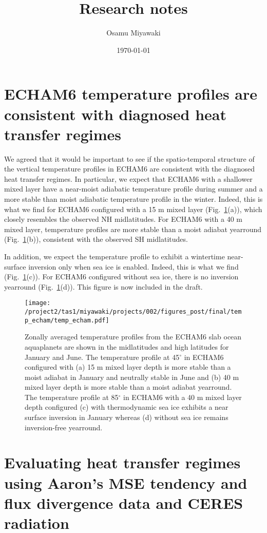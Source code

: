 \documentclass{article}
\title{Research notes}
\date{\today}
\author{Osamu Miyawaki}
\begin{document}
\maketitle

\section{ECHAM6 temperature profiles are consistent with diagnosed heat transfer regimes}

We agreed that it would be important to see if the spatio-temporal structure of the vertical temperature profiles in ECHAM6 are consistent with the diagnosed heat transfer regimes. In particular, we expect that ECHAM6 with a shallower mixed layer have a near-moist adiabatic temperature profile during summer and a more stable than moist adiabatic temperature profile in the winter. Indeed, this is what we find for ECHAM6 configured with a 15 m mixed layer (Fig.~\ref{fig:temp-echam}(a)), which closely resembles the observed NH midlatitudes. For ECHAM6 with a 40 m mixed layer, temperature profiles are more stable than a moist adiabat yearround (Fig.~\ref{fig:temp-echam}(b)), consistent with the observed SH midlatitudes.

In addition, we expect the temperature profile to exhibit a wintertime near-surface inversion only when sea ice is enabled. Indeed, this is what we find (Fig.~\ref{fig:temp-echam}(c)). For ECHAM6 configured without sea ice, there is no inversion yearround (Fig.~\ref{fig:temp-echam}(d)). This figure is now included in the draft.

\begin{figure}
    \texttt{[image: /project2/tas1/miyawaki/projects/002/figures\_post/final/temp\_echam/temp\_echam.pdf]}
    \caption{Zonally averaged temperature profiles from the ECHAM6 slab ocean aquaplanets are shown in the midlatitudes and high latitudes for January and June. The temperature profile at 45$^\circ$ in ECHAM6 configured with (a) 15 m mixed layer depth is more stable than a moist adiabat in January and neutrally stable in June and (b) 40 m mixed layer depth is more stable than a moist adiabat yearround. The temperature profile at 85$^\circ$ in ECHAM6 with a 40 m mixed layer depth configured (c) with thermodynamic sea ice exhibits a near surface inversion in January whereas (d) without sea ice remains inversion-free yearround.}
    \label{fig:temp-echam}
\end{figure}

\section{Evaluating heat transfer regimes using Aaron's MSE tendency and flux divergence data and CERES radiation}
\end{document}

